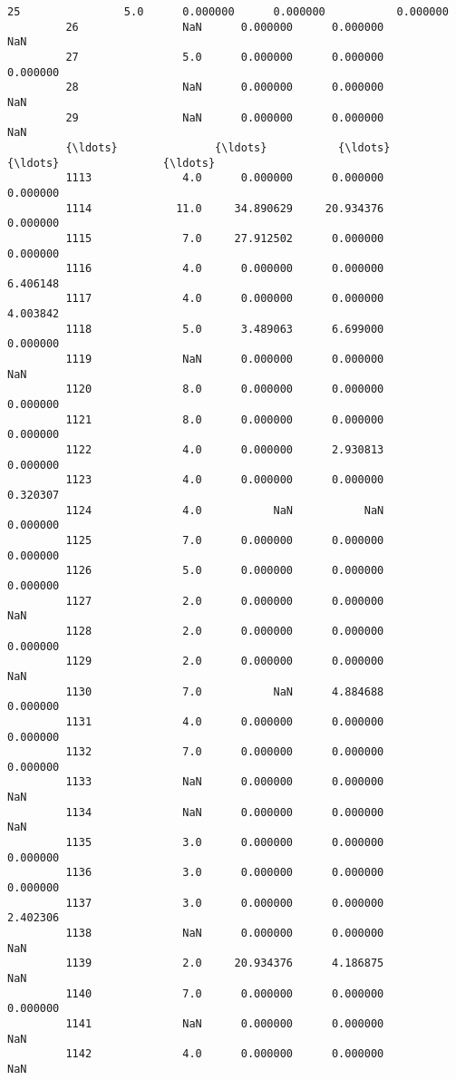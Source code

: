 \documentclass[11pt]{article}
\begin{document}
\begin{Verbatim}[commandchars=\\\{\}]
         25                5.0      0.000000      0.000000           0.000000   
         26                NaN      0.000000      0.000000                NaN   
         27                5.0      0.000000      0.000000           0.000000   
         28                NaN      0.000000      0.000000                NaN   
         29                NaN      0.000000      0.000000                NaN   
         {\ldots}               {\ldots}           {\ldots}           {\ldots}                {\ldots}   
         1113              4.0      0.000000      0.000000           0.000000   
         1114             11.0     34.890629     20.934376           0.000000   
         1115              7.0     27.912502      0.000000           0.000000   
         1116              4.0      0.000000      0.000000           6.406148   
         1117              4.0      0.000000      0.000000           4.003842   
         1118              5.0      3.489063      6.699000           0.000000   
         1119              NaN      0.000000      0.000000                NaN   
         1120              8.0      0.000000      0.000000           0.000000   
         1121              8.0      0.000000      0.000000           0.000000   
         1122              4.0      0.000000      2.930813           0.000000   
         1123              4.0      0.000000      0.000000           0.320307   
         1124              4.0           NaN           NaN           0.000000   
         1125              7.0      0.000000      0.000000           0.000000   
         1126              5.0      0.000000      0.000000           0.000000   
         1127              2.0      0.000000      0.000000                NaN   
         1128              2.0      0.000000      0.000000           0.000000   
         1129              2.0      0.000000      0.000000                NaN   
         1130              7.0           NaN      4.884688           0.000000   
         1131              4.0      0.000000      0.000000           0.000000   
         1132              7.0      0.000000      0.000000           0.000000   
         1133              NaN      0.000000      0.000000                NaN   
         1134              NaN      0.000000      0.000000                NaN   
         1135              3.0      0.000000      0.000000           0.000000   
         1136              3.0      0.000000      0.000000           0.000000   
         1137              3.0      0.000000      0.000000           2.402306   
         1138              NaN      0.000000      0.000000                NaN   
         1139              2.0     20.934376      4.186875                NaN   
         1140              7.0      0.000000      0.000000           0.000000   
         1141              NaN      0.000000      0.000000                NaN   
         1142              4.0      0.000000      0.000000                NaN   
         

\end{Verbatim}
\end{document}
